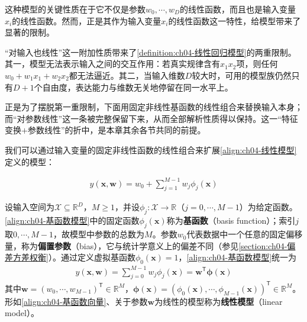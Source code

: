 \documentclass[../../main.tex]{subfiles}
\begin{document}
这种模型的关键性质在于它不仅是参数$w_0,\cdots,w_D$的线性函数，而且也是输入变量$x_i$的线性函数。然而，正是其作为输入变量$x_i$的线性函数这一特性，给模型带来了显著的限制。

\begin{remark}
“对输入也线性”这一附加性质带来了\cref{definition:ch04-线性回归模型}的两重限制。其一，模型无法表示输入之间的交互作用：若真实规律含有$x_1x_2$项，则任何$w_0+w_1x_1+w_2x_2$都无法逼近。其二，当输入维数$D$较大时，可用的模型族仍然只有$D+1$个自由度，表达能力与维数无关地停留在同一水平上。

正是为了摆脱第一重限制，下面用固定非线性基函数的线性组合来替换输入本身；而“对参数线性”这一条被完整保留下来，从而全部解析性质得以保持。这一“特征变换$+$参数线性”的折中，是本章其余各节共同的前提。
\end{remark}

我们可以通过输入变量的固定非线性函数的线性组合来扩展\eqref{align:ch04-线性模型}定义的模型：

\begin{align}
  y(\boldsymbol{x},\boldsymbol{w})=w_0+\sum_{j=1}^{M-1}w_j\phi_j(\boldsymbol{x})
  \label{align:ch04-基函数模型}
\end{align}

\begin{definition}[基函数与偏置参数]\label{definition:ch04-基函数}
设输入空间为$\mathcal{X}\subseteq\mathbb{R}^{D}$，$M\geqslant1$，并设$\phi_j:\mathcal{X}\to\mathbb{R}$（$j=0,\cdots,M-1$）为给定函数。\eqref{align:ch04-基函数模型}中的固定函数$\phi_j(\boldsymbol{x})$称为\textbf{基函数}（basis function）；索引$j$取$0,\cdots,M-1$，故模型中参数的总数为$M$。参数$w_0$代表数据中一个任意的固定偏移量，称为\textbf{偏置参数}（bias），它与统计学意义上的偏差不同（参见\cref{section:ch04-偏差方差权衡}）。通过定义虚拟基函数$\phi_0(\boldsymbol{x})=1$，\eqref{align:ch04-基函数模型}统一为
\begin{align}
  y(\boldsymbol{x},\boldsymbol{w})=\sum_{j=0}^{M-1}w_j\phi_j(\boldsymbol{x})=\boldsymbol{w}^{\mathsf{T}}\boldsymbol{\phi}(\boldsymbol{x})
  \label{align:ch04-基函数向量}
\end{align}
其中$\boldsymbol{w}=(w_0,\cdots,w_{M-1})^{\mathsf{T}}\in\mathbb{R}^{M}$，$\boldsymbol{\phi}(\boldsymbol{x})=(\phi_0(\boldsymbol{x}),\cdots,\phi_{M-1}(\boldsymbol{x}))^{\mathsf{T}}\in\mathbb{R}^{M}$。形如\eqref{align:ch04-基函数向量}、关于参数$\boldsymbol{w}$为线性的模型称为\textbf{线性模型}（linear model）。
\end{definition}
\end{document}
